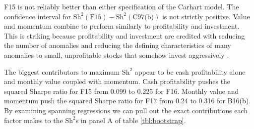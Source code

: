 F15 is not reliably better than either specification of the Carhart model. The confidence
interval for $\text{Sh}^2(\text{F15})-\text{Sh}^2(\text{C97(b)})$ is not strictly
positive. Value and momentum combine to perform similarly to profitability and investment.
This is striking because profitability and investment are credited with reducing the
number of anomalies and reducing the defining characteristics of many anomalies to small,
unprofitable stocks that somehow invest aggressively \parencite{fama2015five,
fama2016dissecting}.

The biggest contributors to maximum $\text{Sh}^2$ appear to be cash profitability alone
and monthly value coupled with momentum. Cash profitability pushes the squared Sharpe
ratio for F15 from 0.099 to 0.225 for F16. Monthly value and momentum push the squared
Sharpe ratio for F17 from 0.24 to 0.316 for B16(b). By examining spanning regressions we
can pull out the exact contributions each factor makes to the $\text{Sh}^2$s in panel A of table \ref{tbl:bootstrap}.
